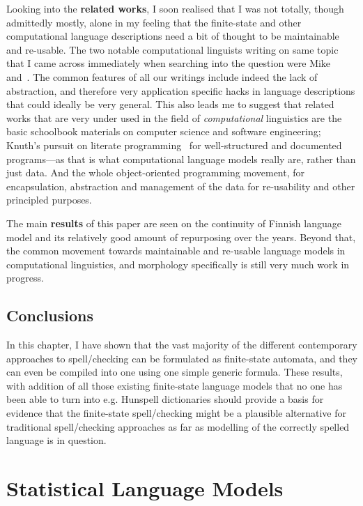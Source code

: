 \documentclass[officiallayout]{unihelcompling}
\begin{document}
Looking into the \textbf{related works}, I soon realised that I was not
totally, though admittedly mostly, alone in my feeling that the finite-state
and other computational language descriptions need a bit of thought to be
maintainable and re-usable. The two notable computational linguists writing on
same topic that I came across immediately when searching into the question were
Mike~\citet{maxwell2008joint} and~\citet{wintner2008strengths}. The
common features of all our writings include indeed the lack of abstraction, and
therefore very application specific hacks in language descriptions that could
ideally be very general. This also leads me to suggest that related works that
are very under used in the field of \emph{computational} linguistics are the
basic schoolbook materials on computer science and software engineering;
Knuth's pursuit on literate programming~\citep{knuth1984literate} for
well-structured and documented programs---as that is what computational
language models really are, rather than just data. And the whole
object-oriented programming movement, for encapsulation, abstraction and
management of the data for re-usability and other principled purposes.

The main \textbf{results} of this paper are seen on the continuity of Finnish
language model and its relatively good amount of repurposing over the years.
Beyond that, the common movement towards maintainable and re-usable language
models in computational linguistics, and morphology specifically is still very
much work in progress.

\section{Conclusions}

In this chapter, I have shown that the vast majority of the different
contemporary approaches to spell\-/checking can be formulated as finite-state
automata, and they can even be compiled into one using one simple generic
formula. These results, with addition of all those existing finite-state
language models that no one has been able to turn into e.g. Hunspell
dictionaries should provide a basis for evidence that the finite-state
spell\-/checking might be a plausible alternative for traditional spell\-/checking
approaches as far as modelling of the correctly spelled language is in
question.

\chapter{Statistical Language Models}
\label{chap:statistical-models}
\end{document}
